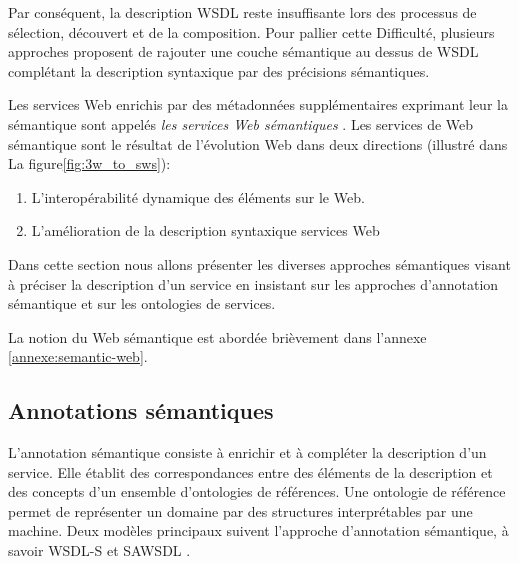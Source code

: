Par conséquent, la description \textsc{WSDL} reste insuffisante lors
des processus de sélection, découvert et de la composition. Pour
pallier cette Difficulté, plusieurs approches
\cite{sivashanmugam2003adding,mcilraith2001semantic,
  mcilraith2003bringing, fensel2002web} proposent de rajouter une
couche sémantique au dessus de \textsc{WSDL} complétant la description
syntaxique par des précisions sémantiques.


\newpage
Les services Web enrichis par des métadonnées supplémentaires
exprimant leur la sémantique sont appelés \textit{les services Web
sémantiques} \cite{fensel2002semantic, mcilraith2001semantic}. Les
services de Web sémantique sont le résultat de l'évolution Web dans
deux directions \cite{bartalos2011effective} (illustré dans La
figure\ref{fig:3w_to_sws}):

\begin{enumerate}
  \item L'interopérabilité dynamique des éléments sur le Web.
  \item L'amélioration de la description syntaxique services Web
\end{enumerate}

Dans cette section nous allons présenter les diverses approches
sémantiques visant à préciser la description d'un service en insistant
sur les approches d'annotation sémantique et sur les ontologies de
services.

La notion du Web sémantique est abordée brièvement dans l'annexe
\ref{annexe:semantic-web}.

  \subsection{Annotations sémantiques}
  \label{sec:semantic-annot}

  L'annotation sémantique consiste à enrichir et à compléter la
  description d'un service. Elle établit des correspondances entre des
  éléments de la description et des concepts d'un ensemble
  d'ontologies de références. Une ontologie de référence permet de
  représenter un domaine par des structures interprétables par une
  machine. Deux modèles principaux suivent l'approche d'annotation
  sémantique, à savoir \textsc{WSDL-S} et \textsc{SAWSDL}
  \cite{elie2010}.

